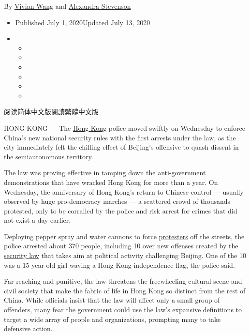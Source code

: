 By \href{https://www.nytimes3xbfgragh.onion/by/vivian-wang}{Vivian Wang}
and
\href{https://www.nytimes3xbfgragh.onion/by/alexandra-stevenson}{Alexandra
Stevenson}

\begin{itemize}
\item
  Published July 1, 2020Updated July 13, 2020
\item
  \begin{itemize}
  \item
  \item
  \item
  \item
  \item
  \item
  \end{itemize}
\end{itemize}

\href{https://cn.nytimes3xbfgragh.onion/china/20200702/hong-kong-security-law-china/}{阅读简体中文版}\href{https://cn.nytimes3xbfgragh.onion/china/20200702/hong-kong-security-law-china/zh-han}{閱讀繁體中文版}

HONG KONG --- The
\href{https://www.nytimes3xbfgragh.onion/2020/07/20/world/asia/hong-kong-coronavirus.html}{Hong
Kong} police moved swiftly on Wednesday to enforce China's new national
security rules with the first arrests under the law, as the city
immediately felt the chilling effect of Beijing's offensive to quash
dissent in the semiautonomous territory.

The law was proving effective in tamping down the anti-government
demonstrations that have wracked Hong Kong for more than a year. On
Wednesday, the anniversary of Hong Kong's return to Chinese control ---
usually observed by huge pro-democracy marches --- a scattered crowd of
thousands protested, only to be corralled by the police and risk arrest
for crimes that did not exist a day earlier.

Deploying pepper spray and water cannons to force
\href{https://www.nytimes3xbfgragh.onion/2020/07/13/world/asia/hong-kong-elections-security.html}{protesters}
off the streets, the police arrested about 370 people, including 10 over
new offenses created by the
\href{https://www.nytimes3xbfgragh.onion/2020/07/13/world/asia/hong-kong-elections-security.html}{security
law} that takes aim at political activity challenging Beijing. One of
the 10 was a 15-year-old girl waving a Hong Kong independence flag, the
police said.

Far-reaching and punitive, the law threatens the freewheeling cultural
scene and civil society that make the fabric of life in Hong Kong so
distinct from the rest of China. While officials insist that the law
will affect only a small group of offenders, many fear the government
could use the law's expansive definitions to target a wide array of
people and organizations, prompting many to take defensive action.

